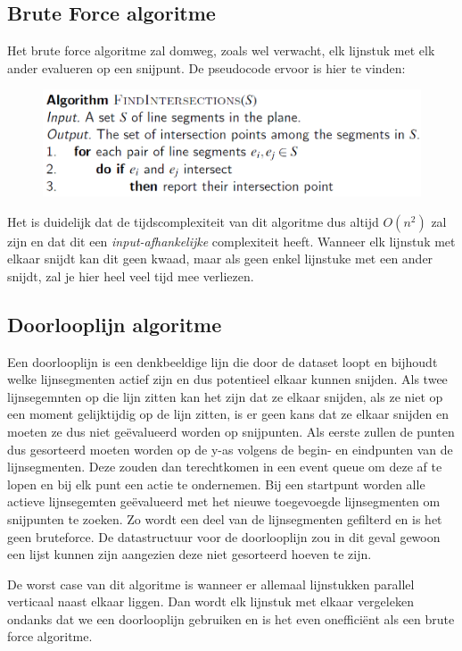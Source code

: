 \documentclass[12pt,a4paper]{article}
\begin{document}
	\subsection{Brute Force algoritme}
	Het brute force algoritme zal domweg, zoals wel verwacht, elk lijnstuk met elk ander evalueren op een snijpunt. De pseudocode ervoor is hier te vinden:
	\begin{figure}[h]
		\centering
		\includegraphics[width=0.8\linewidth]{afbeeldingen/find-Intersections}
		\label{fig:find-intersections}
	\end{figure}
	Het is duidelijk dat de tijdscomplexiteit van dit algoritme dus altijd $O(n^2)$ zal zijn en dat dit een \textit{input-afhankelijke} complexiteit heeft. Wanneer elk lijnstuk met elkaar snijdt kan dit geen kwaad, maar als geen enkel lijnstuke met een ander snijdt, zal je hier heel veel tijd mee verliezen. 
	
	
	\subsection{Doorlooplijn algoritme}
	Een doorlooplijn is een denkbeeldige lijn die door de dataset loopt en bijhoudt welke lijnsegmenten actief zijn en dus potentieel elkaar kunnen snijden. Als twee lijnsegemnten op die lijn zitten kan het zijn dat ze elkaar snijden, als ze niet op een moment gelijktijdig op de lijn zitten, is er geen kans dat ze elkaar snijden en moeten ze dus niet geëvalueerd worden op snijpunten. Als eerste zullen de punten dus gesorteerd moeten worden op de y-as volgens de begin- en eindpunten van de lijnsegmenten. Deze zouden dan terechtkomen in een event queue om deze af te lopen en bij elk punt een actie te ondernemen. Bij een startpunt worden alle actieve lijnsegemten geëvalueerd met het nieuwe toegevoegde lijnsegmenten om snijpunten te zoeken. Zo wordt een deel van de lijnsegmenten gefilterd en is het geen bruteforce. De datastructuur voor de doorlooplijn zou in dit geval gewoon een lijst kunnen zijn aangezien deze niet gesorteerd hoeven te zijn. 
	
	De worst case van dit algoritme is wanneer er allemaal lijnstukken parallel verticaal naast elkaar liggen. Dan wordt elk lijnstuk met elkaar vergeleken ondanks dat we een doorlooplijn gebruiken en is het even onefficiënt als een brute force algoritme. 
		
\end{document}
